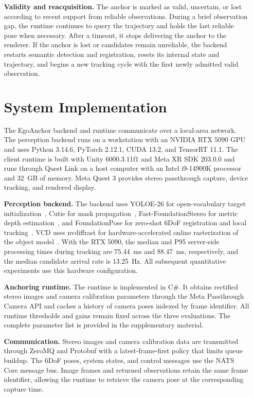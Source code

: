 \documentclass[review]{vgtc}
\begin{document}
\textbf{Validity and reacquisition.}\label{sec:validity}
The anchor is marked as valid, uncertain, or lost according to recent support from reliable observations. During a brief observation gap, the runtime continues to query the trajectory and holds the last reliable pose when necessary. After a timeout, it stops delivering the anchor to the renderer. If the anchor is lost or candidates remain unreliable, the backend restarts semantic detection and registration, resets its internal state and trajectory, and begins a new tracking cycle with the first newly admitted valid observation.

\section{System Implementation}\label{sec:implementation}

The EgoAnchor backend and runtime communicate over a local-area network. The perception backend runs on a workstation with an NVIDIA RTX 5090 GPU and uses Python 3.14.6, PyTorch 2.12.1, CUDA 13.2, and TensorRT 11.1. The client runtime is built with Unity 6000.3.11f1 and Meta XR SDK 203.0.0 and runs through Quest Link on a host computer with an Intel i9-14900K processor and 32~GB of memory. Meta Quest 3 provides stereo passthrough capture, device tracking, and rendered display.

\textbf{Perception backend.}
The backend uses YOLOE-26 for open-vocabulary target initialization~\cite{yoloe2025}, Cutie for mask propagation~\cite{cutie2024}, Fast-FoundationStereo for metric depth estimation~\cite{fastfoundationstereo2026}, and FoundationPose for zero-shot 6DoF registration and local tracking~\cite{foundationpose2024}. VCD uses nvdiffrast for hardware-accelerated online rasterization of the object model~\cite{nvdiffrast2020}. With the RTX 5090, the median and P95 server-side processing times during tracking are 75.44~ms and 88.47~ms, respectively, and the median candidate arrival rate is 13.25~Hz. All subsequent quantitative experiments use this hardware configuration.

\textbf{Anchoring runtime.}
The runtime is implemented in C\#. It obtains rectified stereo images and camera calibration parameters through the Meta Passthrough Camera API and caches a history of camera poses indexed by frame identifier. All runtime thresholds and gains remain fixed across the three evaluations. The complete parameter list is provided in the supplementary material.

\textbf{Communication.}
Stereo images and camera calibration data are transmitted through ZeroMQ and Protobuf with a latest-frame-first policy that limits queue buildup. The 6DoF poses, system states, and control messages use the NATS Core message bus. Image frames and returned observations retain the same frame identifier, allowing the runtime to retrieve the camera pose at the corresponding capture time.
\end{document}
